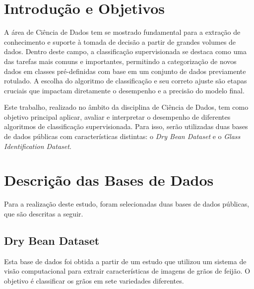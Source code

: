 \documentclass[
  letterpaper,
  DIV=11,
  numbers=noendperiod]{scrartcl}
\begin{document}
\section{Introdução e Objetivos}\label{introduuxe7uxe3o-e-objetivos}

A área de Ciência de Dados tem se mostrado fundamental para a extração
de conhecimento e suporte à tomada de decisão a partir de grandes
volumes de dados. Dentro deste campo, a classificação supervisionada se
destaca como uma das tarefas mais comuns e importantes, permitindo a
categorização de novos dados em classes pré-definidas com base em um
conjunto de dados previamente rotulado. A escolha do algoritmo de
classificação e seu correto ajuste são etapas cruciais que impactam
diretamente o desempenho e a precisão do modelo final.

Este trabalho, realizado no âmbito da disciplina de Ciência de Dados,
tem como objetivo principal aplicar, avaliar e interpretar o desempenho
de diferentes algoritmos de classificação supervisionada. Para isso,
serão utilizadas duas bases de dados públicas com características
distintas: o \emph{Dry Bean Dataset} e o \emph{Glass Identification
Dataset}.

\section{Descrição das Bases de
Dados}\label{descriuxe7uxe3o-das-bases-de-dados}

Para a realização deste estudo, foram selecionadas duas bases de dados
públicas, que são descritas a seguir.

\subsection{Dry Bean Dataset}\label{dry-bean-dataset}

Esta base de dados foi obtida a partir de um estudo que utilizou um
sistema de visão computacional para extrair características de imagens
de grãos de feijão. O objetivo é classificar os grãos em sete variedades
diferentes.
\end{document}
